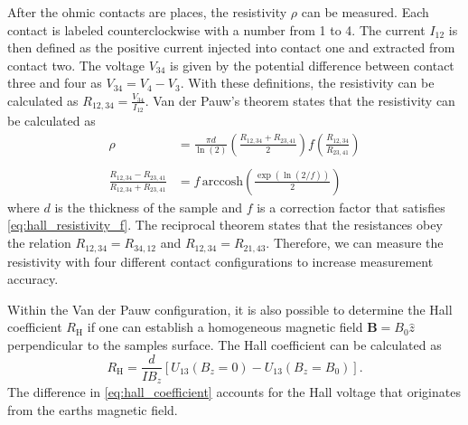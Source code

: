 After the ohmic contacts are places, the resistivity $\rho$ can be measured.
Each contact is labeled counterclockwise with a number from 1 to 4.
The current $I_{12}$ is then defined as the positive current injected into contact one and extracted from contact two.
The voltage $V_{34}$ is given by the potential difference between contact three and four as $V_{34}=V_4-V_3$. 
With these definitions, the resistivity can be calculated as $R_{12,34}=\frac{V_{34}}{I_{12}}$. 
Van der Pauw's theorem states that the resistivity can be calculated as 
$$
\begin{align}
\rho&=\frac{\pi d}{\ln(2)} \left( \frac{R_{12,34}+R_{23,41}}{2} \right)f
\left( \frac{R_{12,34}}{R_{23,41}} \right) \\
\label{eq:hall_resistivity}\\
\frac{R_{12,34}-R_{23,41}}{R_{12,34}+R_{23,41}}&=f \, \text{arccosh}\left( \frac{\exp(\ln(2 /f))}{2} \right)
\label{eq:hall_resistivity_f}
\end{align}
$$
where $d$ is the thickness of the sample and $f$ is a correction factor that satisfies \cref{eq:hall_resistivity_f}. 
The reciprocal theorem states that the resistances obey the relation $R_{12,34}=R_{34,12}$ and $R_{12,34}=R_{21,43}$.
Therefore, we can measure the resistivity with four different contact configurations to increase measurement accuracy.

Within the Van der Pauw configuration, it is also possible to determine the Hall coefficient $R_{\mathrm{H}}$ if 
one can establish a homogeneous magnetic field $\mathbf{B}=B_{0} \hat{z}$ perpendicular to the samples surface. 
The Hall coefficient can be calculated as
$$
R_{\mathrm{H}}=\frac{d}{IB_{z}} [U_{13}(B_{z}=0)-U_{13}(B_{z}=B_{0})].
\label{eq:hall_coefficient}
$$
The difference in  \cref{eq:hall_coefficient} accounts for the Hall voltage that originates from the earths magnetic field.



